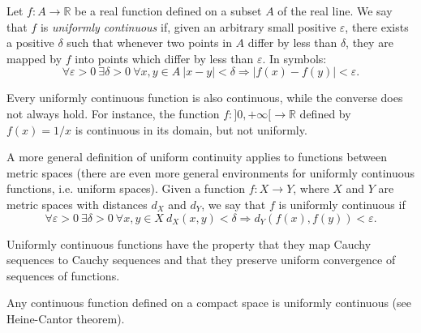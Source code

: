 \documentclass[12pt]{article}
\begin{document}
Let $f: A \rightarrow \mathbb{R}$ be a real function defined on a subset $A$ of the real line. We say that $f$ is \emph{uniformly continuous} if, given an arbitrary small positive $\varepsilon$, there exists a positive $\delta$ such that whenever two points in $A$ differ by less than $\delta$, they are mapped by $f$ into points which differ by less than $\varepsilon$. In symbols:
\[ \forall \varepsilon > 0\ \exists \delta > 0\ \forall x,y \in A\ |x-y| < \delta \Rightarrow |f(x)-f(y)| < \varepsilon. \]

Every uniformly continuous function is also continuous, while the converse does not always hold. For instance, the function $f: ]0,+\infty[ \rightarrow \mathbb{R}$ defined by $f(x) = 1/x$ is continuous in its domain, but not uniformly.

A more general definition of uniform continuity applies to functions between metric spaces (there are even more general environments for uniformly continuous functions, i.e. uniform spaces).
Given a function $f: X \rightarrow Y$, where $X$ and $Y$ are metric spaces with distances $d_X$ and $d_Y$, we say that $f$ is uniformly continuous if
\[ \forall \varepsilon > 0\ \exists \delta > 0\ \forall x,y \in X\ d_X(x,y) < \delta \Rightarrow d_Y(f(x),f(y)) < \varepsilon. \]

Uniformly continuous functions have the property that they map Cauchy sequences to Cauchy sequences and that they preserve uniform convergence of sequences of functions.

Any continuous function defined on a compact space is uniformly continuous (see Heine-Cantor theorem).
\end{document}
